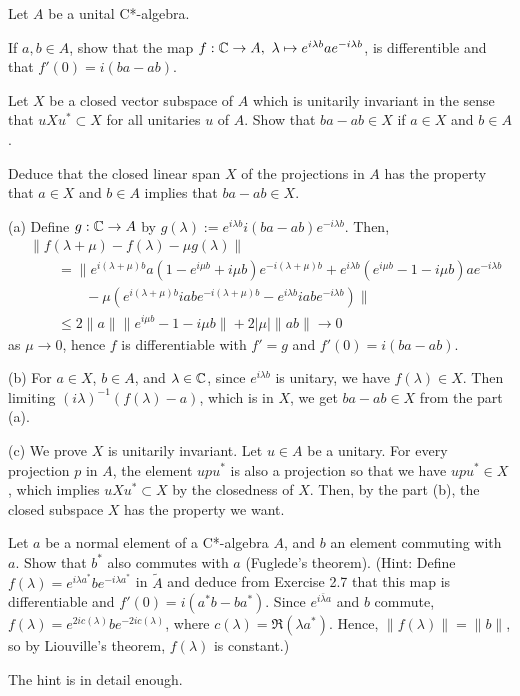 \documentclass{article}
\begin{document}
\begin{prb}
Let $A$ be a unital C*-algebra.
\begin{parts}
\item
If $a,b\in A$, show that the map $f:\mathbb{C}\to A,\ \lambda\mapsto e^{i\lambda b}ae^{-i\lambda b}$, is differentible and that $f'(0)=i(ba-ab)$.
\item
Let $X$ be a closed vector subspace of $A$ which is unitarily invariant in the sense that $uXu^*\subset X$ for all unitaries $u$ of $A$.
Show that $ba-ab\in X$ if $a\in X$ and $b\in A$.
\item
Deduce that the closed linear span $X$ of the projections in $A$ has the property that $a\in X$ and $b\in A$ implies that $ba-ab\in X$.
\end{parts}
\end{prb}
\begin{sol}
(a)
Define $g:\mathbb{C}\to A$ by $g(\lambda):=e^{i\lambda b}i(ba-ab)e^{-i\lambda b}$.
Then,
\begin{align*}
&\|f(\lambda+\mu)-f(\lambda)-\mu g(\lambda)\|\\
&\qquad=\|e^{i(\lambda+\mu)b}a(1-e^{i\mu b}+i\mu b)e^{-i(\lambda+\mu)b}
+e^{i\lambda b}(e^{i\mu b}-1-i\mu b)ae^{-i\lambda b}\\
&\qquad\qquad-\mu(e^{i(\lambda+\mu)b}iabe^{-i(\lambda+\mu)b}-e^{i\lambda b}iabe^{-i\lambda b})\|\\
&\qquad\le2\|a\|\|e^{i\mu b}-1-i\mu b\|+2|\mu|\|ab\|\to0
\end{align*}
as $\mu\to0$, hence $f$ is differentiable with $f'=g$ and $f'(0)=i(ba-ab)$.

(b)
For $a\in X$, $b\in A$, and $\lambda\in\mathbb{C}$, since $e^{i\lambda b}$ is unitary, we have $f(\lambda)\in X$.
Then limiting $(i\lambda)^{-1}(f(\lambda)-a)$, which is in $X$, we get $ba-ab\in X$ from the part (a).

(c)
We prove $X$ is unitarily invariant.
Let $u\in A$ be a unitary.
For every projection $p$ in $A$, the element $upu^*$ is also a projection so that we have $upu^*\in X$, which implies $uXu^*\subset X$ by the closedness of $X$.
Then, by the part (b), the closed subspace $X$ has the property we want.
\end{sol}


\begin{prb}
Let $a$ be a normal element of a C*-algebra $A$, and $b$ an element commuting with $a$. Show that $b^*$ also commutes with $a$ (Fuglede's theorem).
(Hint: Define $f(\lambda)=e^{i\lambda a^*}be^{- i\lambda a^*}$ in $\tilde A$ and deduce from Exercise 2.7 that this map is differentiable and $f'(0)=i(a^*b-ba^*)$.
Since $e^{i\bar\lambda a}$ and $b$ commute, $f(\lambda)=e^{2ic(\lambda)}be^{-2ic(\lambda)}$, where $c(\lambda)=\Re(\lambda a^*)$.
Hence, $\|f(\lambda)\|=\|b\|$, so by Liouville's theorem, $f(\lambda)$ is constant.)
\end{prb}
\begin{sol}
The hint is in detail enough.
\end{sol}
\end{document}
